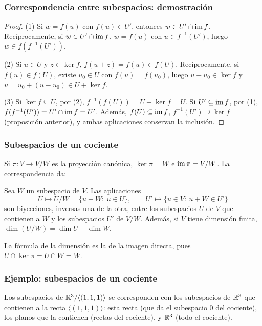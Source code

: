 \begin{frame}
    \frametitle{Correspondencia entre subespacios: demostración}

    \begin{proof}
        \alert{(1)} Si $w=f(u)$ con $f(u)\in U'$, entonces
        $w\in U'\cap\operatorname{im} f$. Recíprocamente, si $w\in U'\cap\operatorname{im} f$,
        $w=f(u)$ con $u\in f^{-1}(U')$, luego $w\in f(f^{-1}(U'))$.

        \alert{(2)} Si $u\in U$ y $z\in\ker f$, $f(u+z)=f(u)\in f(U)$.
        Recíprocamente, si $f(u)\in f(U)$, existe $u_0\in U$ con
        $f(u)=f(u_0)$, luego $u-u_0\in\ker f$ y
        $u=u_0+(u-u_0)\in U+\ker f$.

        \alert{(3)} Si $\ker f\subseteq U$, por (2),
        $f^{-1}(f(U))=U+\ker f=U$. Si $U'\subseteq\operatorname{im} f$, por (1),
        $f(f^{-1}(U'))=U'\cap\operatorname{im} f=U'$. Además, $f(U)\subseteq\operatorname{im} f$,
        $f^{-1}(U')\supseteq\ker f$ (proposición anterior), y ambas
        aplicaciones conservan la inclusión.
    \end{proof}
\end{frame}


\begin{frame}
    \frametitle{Subespacios de un cociente}

    Si $\pi\colon V\to V/W$ es la proyección canónica, $\ker\pi=W$ e
    $\operatorname{im}\pi=V/W$. La correspondencia da:

    \begin{corollary}
        Sea $W$ un subespacio de $V$. Las aplicaciones
        \[
            U\longmapsto U/W=\{u+W:\ u\in U\},
            \qquad
            U'\longmapsto\{u\in V:\ u+W\in U'\}
        \]
        son biyecciones, inversas una de la otra, entre los subespacios
        $U$ de $V$ que contienen a $W$ y los subespacios $U'$ de $V/W$.
        Además, si $V$ tiene dimensión finita, $\dim(U/W)=\dim U-\dim W$.
    \end{corollary}

    La fórmula de la dimensión es la de la imagen directa, pues
    $U\cap\ker\pi=U\cap W=W$.
\end{frame}


\begin{frame}
    \frametitle{Ejemplo: subespacios de un cociente}

    \begin{example}
        Los subespacios de $\mathbb{R}^3/\langle(1,1,1)\rangle$ se corresponden
        con los subespacios de $\mathbb{R}^3$ que contienen a la recta
        $\langle(1,1,1)\rangle$: esta recta (que da el subespacio $0$ del
        cociente), los planos que la contienen (rectas del cociente), y
        $\mathbb{R}^3$ (todo el cociente).
    \end{example}
\end{frame}



